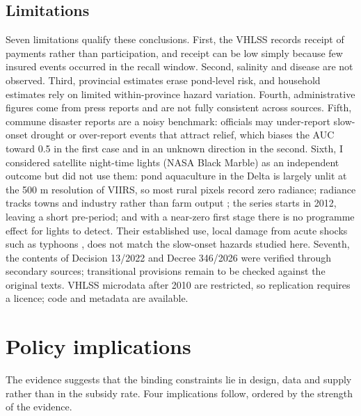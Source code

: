 \documentclass[11pt,a4paper]{article}
\begin{document}
\subsection{Limitations}

Seven limitations qualify these conclusions. First, the VHLSS records receipt of payments rather than participation, and receipt can be low simply because few insured events occurred in the recall window. Second, salinity and disease are not observed. Third, provincial estimates erase pond-level risk, and household estimates rely on limited within-province hazard variation. Fourth, administrative figures come from press reports and are not fully consistent across sources. Fifth, commune disaster reports are a noisy benchmark: officials may under-report slow-onset drought or over-report events that attract relief, which biases the AUC toward 0.5 in the first case and in an unknown direction in the second. Sixth, I considered satellite night-time lights (NASA Black Marble) as an independent outcome but did not use them: pond aquaculture in the Delta is largely unlit at the 500 m resolution of VIIRS, so most rural pixels record zero radiance; radiance tracks towns and industry rather than farm output \parencite{henderson2012,roman2018}; the series starts in 2012, leaving a short pre-period; and with a near-zero first stage there is no programme effect for lights to detect. Their established use, local damage from acute shocks such as typhoons \parencite{elliott2015}, does not match the slow-onset hazards studied here. Seventh, the contents of Decision 13/2022 and Decree 346/2026 were verified through secondary sources; transitional provisions remain to be checked against the original texts. VHLSS microdata after 2010 are restricted, so replication requires a licence; code and metadata are available.

\section{Policy implications}
\label{sec:policy}

The evidence suggests that the binding constraints lie in design, data and supply rather than in the subsidy rate. Four implications follow, ordered by the strength of the evidence.
\end{document}
